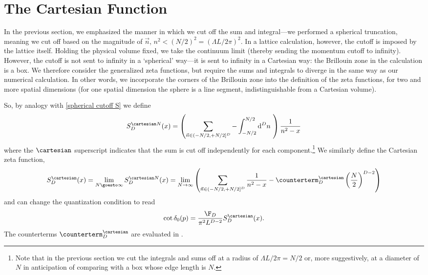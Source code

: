 \section{The Cartesian Function}\label{sec:cartesian}

In the previous section, we emphasized the manner in which we cut off the sum and integral---we performed a spherical truncation, meaning we cut off based on the magnitude of $\vec{n}$, $n^2 < (N/2)^2 = (\Lambda L/2\pi)^2$.
In a lattice calculation, however, the cutoff is imposed by the lattice itself.
Holding the physical volume fixed, we take the continuum limit (thereby sending the momentum cutoff to infinity).
However, the cutoff is not sent to infinity in a `spherical' way---it is sent to infinity in a Cartesian way: the Brillouin zone in the calculation is a box. 
We therefore consider the generalized zeta functions, but require the sums and integrals to diverge in the same way as our numerical calculation.
In other words, we incorporate the corners of the Brillouin zone into the definition of the zeta functions, for two and more spatial dimensions (for one spatial dimension the sphere is a line segment, indistinguishable from a Cartesian volume).

So, by analogy with \eqref{spherical cutoff S} we define
\begin{equation}
        S^{\cartesian N}_D(x)
        = \left(
            \sum_{\vec{n} \in (-N/2, +N/2]^D}
            -
            \int_{-N/2}^{N/2} \mathrm{d}^Dn\
        \right) \frac{1}{n^2-x}
\end{equation}
where the $\cartesian$ superscript indicates that the sum is cut off independently for each component.\footnote{Note that in the previous section we cut the integrals and sums off at a radius of $\Lambda L / 2\pi = N/2$ or, more suggestively, at a diameter of $N$ in anticipation of comparing with a box whose edge length is $N$.}
We similarly define the Cartesian zeta function,
\begin{equation}\label{eq:cartesian S}
    S^{\cartesian}_D(x)
    =
    \lim_{N\goesto\infty} S^{\cartesian N}_D(x)
    =
    \lim_{N\rightarrow\infty}\left( \sum_{\vec{n} \in (-N/2, +N/2]^D} \frac{1}{n^2-x} - \counterterm_D^\cartesian \left(\frac{N}{2}\right)^{D-2}\right)
\end{equation}
and can change the quantization condition to read
\begin{equation}\label{eq:cartesian quantization}
    \cot \delta_0(p) = \frac{\F_D}{\pi^2 L^{D-2}} S^\cartesian_D(x).
\end{equation}
The counterterms $\counterterm_D^\cartesian$ are evaluated in .

